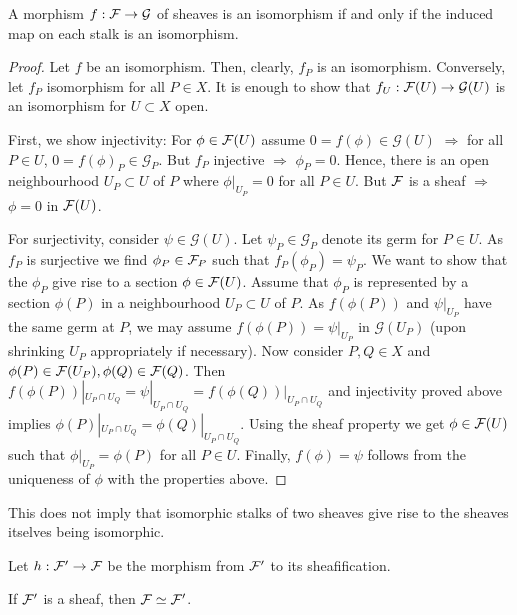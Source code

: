 \documentclass[a4paper,11pt]{article}
\begin{document}
			\begin{prop}
				A morphism $f:\mathcal{F}\rightarrow\mathcal{G}$ of sheaves is an isomorphism if and only if the induced map on each stalk is an isomorphism.
			\end{prop}
			\begin{proof}
				Let $f$ be an isomorphism. Then, clearly, $f_P$ is an isomorphism. Conversely, let $f_P$ isomorphism for all $P\in X$. It is enough to show that $f_U:\mathcal{F}(U)\rightarrow\mathcal{G}(U)$ is an isomorphism for $U\subset X$ open. 
				
				First, we show injectivity: For $\phi\in\mathcal{F}(U)$ assume $0=f(\phi)\in\mathcal{G}(U)$ $\Longrightarrow$ for all $P\in U$, $0=f(\phi)_P\in\mathcal{G}_P$. But $f_P$ injective $\Longrightarrow$ $\phi_P=0$. Hence, there is an open neighbourhood $U_P\subset U$ of $P$ where $\phi|_{U_P}=0$ for all $P\in U$. But $\mathcal{F}$ is a sheaf $\Longrightarrow$ $\phi=0$ in $\mathcal{F}(U)$.
				
				For surjectivity, consider $\psi\in\mathcal{G}(U)$. Let $\psi_P\in\mathcal{G}_P$ denote its germ for $P\in U$. As $f_P$ is surjective we find $\phi_P\in\mathcal{F}_P$ such that $f_P(\phi_P)=\psi_P$. We want to show that the $\phi_P$ give rise to a section $\phi\in\mathcal{F}(U)$. Assume that $\phi_P$ is represented by a section $\phi(P)$ in a neighbourhood $U_P\subset U$ of $P$. As $f(\phi(P))$ and $\psi|_{U_P}$ have the same germ at $P$, we may assume $f(\phi(P))=\psi|_{U_P}$ in $\mathcal{G}(U_P)$ (upon shrinking $U_P$ appropriately if necessary). Now consider $P,Q\in X$ and $\phi(P)\in\mathcal{F}(U_P),\phi(Q)\in\mathcal{F}(Q)$. Then $f(\phi(P))|_{U_P\cap U_Q}=\psi|_{U_P\cap U_Q}=f(\phi(Q))|_{U_P\cap U_Q}$ and injectivity proved above implies $\phi(P)|_{U_P\cap U_Q}=\phi(Q)|_{U_P\cap U_Q}$. Using the sheaf property we get $\phi\in\mathcal{F}(U)$ such that $\phi|_{U_P}=\phi(P)$ for all $P\in U$. Finally, $f(\phi)=\psi$ follows from the uniqueness of $\phi$ with the properties above.
			\end{proof}
			
			\begin{remark}
				This does not imply that isomorphic stalks of two sheaves give rise to the sheaves itselves being isomorphic.
			\end{remark}

			Let $h:\mathcal{F}^\prime\rightarrow\mathcal{F}$ be the morphism from $\mathcal{F}^\prime$ to its sheafification.

			\begin{cor}
				If $\mathcal{F}^\prime$ is a sheaf, then $\mathcal{F}\simeq\mathcal{F}^\prime$.
			\end{cor}
\end{document}
